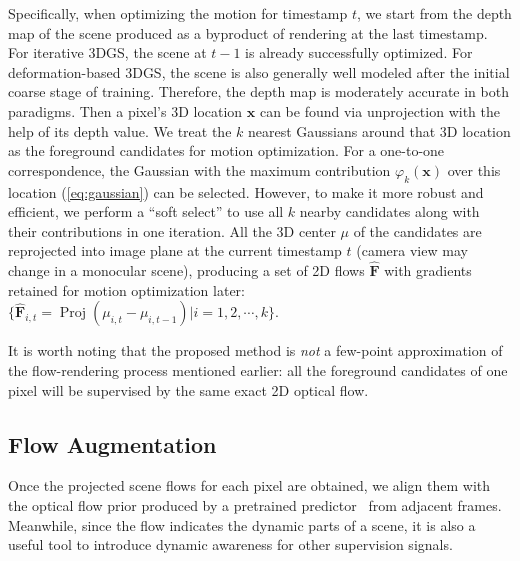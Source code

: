 \documentclass[runningheads]{llncs}
\begin{document}
Specifically, when optimizing the motion for timestamp $t$, we start from the depth map of the scene produced as a byproduct of rendering at the last timestamp. 
For iterative 3DGS, the scene at $t-1$ is already successfully optimized. 
For deformation-based 3DGS, the scene is also generally well modeled after the initial coarse stage of training. 
Therefore, the depth map is moderately accurate in both paradigms. 
Then a pixel's 3D location $\mathbf{x}$ can be found via unprojection with the help of its depth value. 
We treat the $k$ nearest Gaussians around that 3D location as the foreground candidates for motion optimization. 
For a one-to-one correspondence, the Gaussian with the maximum contribution $\varphi_{k}(\mathbf{x})$ over this location (\cref{eq:gaussian}) can be selected. 
However, to make it more robust and efficient, we perform a ``soft select'' to use all $k$ nearby candidates along with their contributions in one iteration. 
All the 3D center $\mu$ of the candidates are reprojected into image plane at the current timestamp $t$ (camera view may change in a monocular scene), producing a set of 2D flows $\hat{\mathbf{F}}$ with gradients retained for motion optimization later: $\{\hat{\mathbf{F}}_{i,t}=\operatorname{Proj}(\mu_{i,t}-\mu_{i,t-1}) | i=1,2,\cdots,k\}$.

It is worth noting that the proposed method is \textit{not} a few-point approximation of the flow-rendering process mentioned earlier: all the foreground candidates of one pixel will be supervised by the same exact 2D optical flow.

\subsection{Flow Augmentation}
\label{sec:flow}

Once the projected scene flows for each pixel are obtained, we align them with the optical flow prior produced by a pretrained predictor~\cite{unimatch} from adjacent frames. Meanwhile, since the flow indicates the dynamic parts of a scene, it is also a useful tool to introduce dynamic awareness for other supervision signals.
\end{document}
